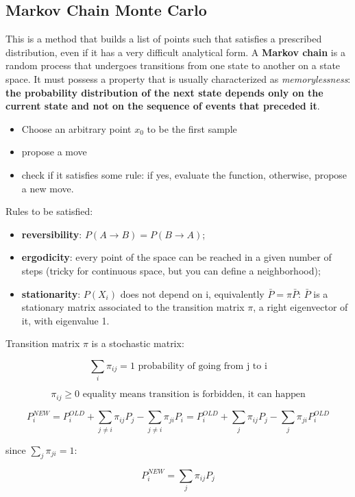 \documentclass[a4paper, italian, openany]{book}
\begin{document}
\subsection{Markov Chain Monte Carlo}

This is a method that builds a list of points such that satisfies a prescribed distribution, even if it has a very difficult analytical form. A \textbf{Markov chain} is a random process that undergoes transitions from one state to another on a state space. It must possess a property that is usually characterized as \textit{memorylessness}: \textbf{the probability distribution of the next state depends only on the current state and not on the sequence of events that preceded it}.

\begin{itemize}
\item Choose an arbitrary point $x_0$ to be the first sample
\item propose a move
\item check if it satisfies some rule: if yes, evaluate the function, otherwise, propose a new move.
\end{itemize}

Rules to be satisfied:

\begin{itemize}
\item \textbf{reversibility}: $P(A \rightarrow B) = P(B \rightarrow A)$;
\item \textbf{ergodicity}: every point of the space can be reached in a given number of steps (tricky for continuous space, but you can define a neighborhood);
\item \textbf{stationarity}: $P(X_i)$ does not depend on i, equivalently $\bar{P} = \pi \bar{P}$: $\bar{P}$ is a stationary matrix associated to the transition matrix $\pi$, a right eigenvector of it, with eigenvalue 1.
\end{itemize}

Transition matrix $\pi$ is a stochastic matrix:

$$\sum_i \pi_{ij} = 1 \mbox{ probability of going from j to i}$$

$$\pi_{ij} \ge 0 \mbox{ equality means transition is forbidden, it can happen}$$

$$P_i^{NEW} = P_i^{OLD} + \sum_{j \ne i} \pi_{ij}P_j - \sum_{j \ne i} \pi_{ji}P_i = P_i^{OLD} + \sum_j \pi_{ij}P_j - \sum_j \pi_{ji} P_i^{OLD}$$

since $\sum_j \pi_{ji} = 1$:

$$P_i^{NEW} = \sum_j \pi_{ij}P_j$$
\end{document}
